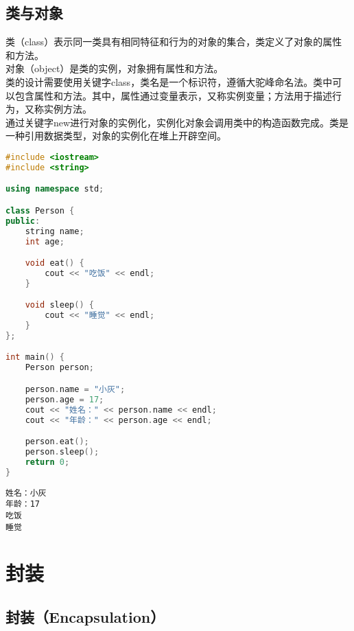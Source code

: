 \subsection{类与对象}

类（class）表示同一类具有相同特征和行为的对象的集合，类定义了对象的属性和方法。\\

对象（object）是类的实例，对象拥有属性和方法。\\

类的设计需要使用关键字class，类名是一个标识符，遵循大驼峰命名法。类中可以包含属性和方法。其中，属性通过变量表示，又称实例变量；方法用于描述行为，又称实例方法。\\

通过关键字new进行对象的实例化，实例化对象会调用类中的构造函数完成。类是一种引用数据类型，对象的实例化在堆上开辟空间。\\


\begin{lstlisting}[language=C++]
#include <iostream>
#include <string>

using namespace std;

class Person {
public:
    string name;
    int age;

    void eat() {
        cout << "吃饭" << endl;
    }

    void sleep() {
        cout << "睡觉" << endl;
    }
};

int main() {
    Person person;

    person.name = "小灰";
    person.age = 17;
    cout << "姓名：" << person.name << endl;
    cout << "年龄：" << person.age << endl;

    person.eat();
    person.sleep();
    return 0;
}
\end{lstlisting}

\begin{tcolorbox}
	\begin{verbatim}
姓名：小灰
年龄：17
吃饭
睡觉
	\end{verbatim}
\end{tcolorbox}

\newpage

\section{封装}

\subsection{封装（Encapsulation）}

